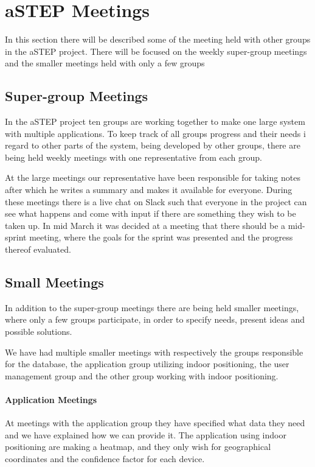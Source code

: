 \section{aSTEP Meetings}
In this section there will be described some of the meeting held with other groups in the aSTEP project. There will be focused on the weekly super-group meetings and the smaller meetings held with only a few groups

\subsection{Super-group Meetings}\label{subsec:supergroup_meetings}
In the aSTEP project ten groups are working together to make one large system with multiple applications. To keep track of all groups progress and their needs i regard to other parts of the system, being developed by other groups, there are being held weekly meetings with one representative from each group.

At the large meetings our representative have been responsible for taking notes after which he writes a summary and makes it available for everyone. During these meetings there is a live chat on Slack \cite{slack}such that everyone in the project can see what happens and come with input if there are something they wish to be taken up. In mid March it was decided at a meeting that there should be a mid-sprint meeting, where the goals for the sprint was presented and the progress thereof evaluated.

\subsection{Small Meetings}\label{subsec:small_meetings}
In addition to the super-group meetings there are being held smaller meetings, where only a few groups participate, in order to specify needs, present ideas and possible solutions.

We have had multiple smaller meetings with respectively the groups responsible for the database, the application group utilizing indoor positioning, the user management group and the other group working with indoor positioning.
 
\paragraph{Application Meetings}
At meetings with the application group they have specified what data they need and we have explained how we can provide it. The application using indoor positioning are making a heatmap, and they only wish for geographical coordinates and the confidence factor for each device.

